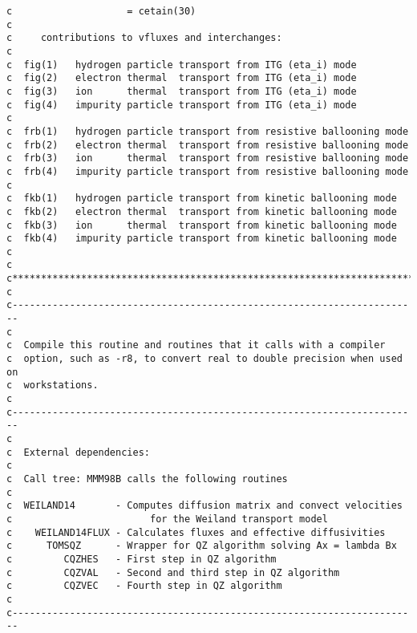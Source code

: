 \begin{verbatim}
c                    = cetain(30)
c
c     contributions to vfluxes and interchanges: 
c
c  fig(1)   hydrogen particle transport from ITG (eta_i) mode
c  fig(2)   electron thermal  transport from ITG (eta_i) mode
c  fig(3)   ion      thermal  transport from ITG (eta_i) mode
c  fig(4)   impurity particle transport from ITG (eta_i) mode
c
c  frb(1)   hydrogen particle transport from resistive ballooning mode
c  frb(2)   electron thermal  transport from resistive ballooning mode
c  frb(3)   ion      thermal  transport from resistive ballooning mode
c  frb(4)   impurity particle transport from resistive ballooning mode
c
c  fkb(1)   hydrogen particle transport from kinetic ballooning mode
c  fkb(2)   electron thermal  transport from kinetic ballooning mode
c  fkb(3)   ion      thermal  transport from kinetic ballooning mode
c  fkb(4)   impurity particle transport from kinetic ballooning mode
c
c
c***********************************************************************
c
c-----------------------------------------------------------------------
c
c  Compile this routine and routines that it calls with a compiler 
c  option, such as -r8, to convert real to double precision when used on 
c  workstations.
c
c-----------------------------------------------------------------------
c
c  External dependencies:
c
c  Call tree: MMM98B calls the following routines
c
c  WEILAND14       - Computes diffusion matrix and convect velocities
c                        for the Weiland transport model
c    WEILAND14FLUX - Calculates fluxes and effective diffusivities
c      TOMSQZ      - Wrapper for QZ algorithm solving Ax = lambda Bx
c         CQZHES   - First step in QZ algorithm 
c         CQZVAL   - Second and third step in QZ algorithm
c         CQZVEC   - Fourth step in QZ algorithm
c
c-----------------------------------------------------------------------


\end{verbatim}

